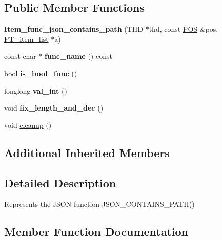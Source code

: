 \subsection*{Public Member Functions}
\begin{DoxyCompactItemize}
\item 
\mbox{\label{classItem__func__json__contains__path_a74caa6d722da7df5d18a37ce99f2b2de}} 
{\bfseries Item\+\_\+func\+\_\+json\+\_\+contains\+\_\+path} (T\+HD $\ast$thd, const \mbox{\hyperlink{structYYLTYPE}{P\+OS}} \&pos, \mbox{\hyperlink{classPT__item__list}{P\+T\+\_\+item\+\_\+list}} $\ast$a)
\item 
\mbox{\label{classItem__func__json__contains__path_ac39b9af19cd37adc25e7b8a9e0b051d5}} 
const char $\ast$ {\bfseries func\+\_\+name} () const
\item 
\mbox{\label{classItem__func__json__contains__path_ae148d951e45f8ceb161be6c75ed60f03}} 
bool {\bfseries is\+\_\+bool\+\_\+func} ()
\item 
\mbox{\label{classItem__func__json__contains__path_a37f26f5341161fb7a5cdd278d95d654b}} 
longlong {\bfseries val\+\_\+int} ()
\item 
\mbox{\label{classItem__func__json__contains__path_ab7312cca853b2b586e1e159b07a4e8f6}} 
void {\bfseries fix\+\_\+length\+\_\+and\+\_\+dec} ()
\item 
void \mbox{\hyperlink{classItem__func__json__contains__path_a599920420407a8997ff4ee3f219b2bc7}{cleanup}} ()
\end{DoxyCompactItemize}
\subsection*{Additional Inherited Members}


\subsection{Detailed Description}
Represents the J\+S\+ON function J\+S\+O\+N\+\_\+\+C\+O\+N\+T\+A\+I\+N\+S\+\_\+\+P\+A\+T\+H() 

\subsection{Member Function Documentation}
\mbox{\label{classItem__func__json__contains__path_a599920420407a8997ff4ee3f219b2bc7}} 
